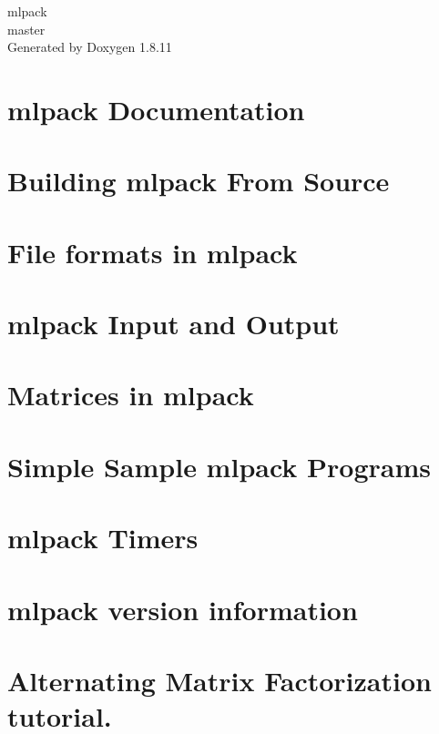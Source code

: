 \documentclass[twoside]{book}
\newcommand{\+}{\discretionary{\mbox{\scriptsize$\hookleftarrow$}}{}{}}
\newcommand{\clearemptydoublepage}{%
  \newpage{\pagestyle{empty}\cleardoublepage}%
}
\begin{document}
\begin{titlepage}
\vspace*{7cm}
\begin{center}%
{\Large mlpack \\[1ex]\large master }\\
\vspace*{1cm}
{\large Generated by Doxygen 1.8.11}\\
\end{center}
\end{titlepage}
\clearemptydoublepage
\tableofcontents
\clearemptydoublepage
{}

\chapter{mlpack Documentation}
\label{index}
\chapter{Building mlpack From Source}
\label{build}

\chapter{File formats in mlpack}
\label{formatdoc}

\chapter{mlpack Input and Output}
\label{iodoc}

\chapter{Matrices in mlpack}
\label{matrices}

\chapter{Simple Sample mlpack Programs}
\label{sample}

\chapter{mlpack Timers}
\label{timer}

\chapter{mlpack version information}
\label{verinfo}

\chapter{Alternating Matrix Factorization tutorial.}
\label{amftutorial}

\end{document}
